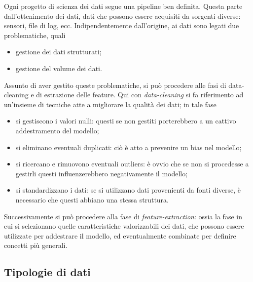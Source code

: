 \documentclass{subfiles}
\begin{document}
Ogni progetto di scienza dei dati segue una pipeline ben definita.
Questa parte dall'ottenimento dei dati, dati che possono essere acquisiti da sorgenti diverse: sensori, file di log, ecc.
Indipendentemente dall'origine, ai dati sono legati due problematiche, quali
\begin{itemize}
    \item gestione dei dati strutturati;
    \item gestione del volume dei dati.
\end{itemize}
Assunto di aver gestito queste problematiche, si può procedere alle fasi di data-cleaning e di estrazione delle feature.
Qui con \emph{data-cleaning} si fa riferimento ad un'insieme di tecniche atte a migliorare la qualità dei dati; in tale fase
\begin{itemize}
    \item si gestiscono i valori nulli: questi se non gestiti porterebbero a un cattivo addestramento del modello;
    \item si eliminano eventuali duplicati: ciò è atto a prevenire un bias nel modello;
    \item si ricercano e rimuovono eventuali outliers: è ovvio che se non si procedesse a gestirli questi influenzerebbero negativamente il modello;
    \item si standardizzano i dati: se si utilizzano dati provenienti da fonti diverse, è necessario che questi abbiano una stessa struttura.
\end{itemize}
Successivamente si può procedere alla fase di \emph{feature-extraction}: ossia la fase in cui si selezionano quelle caratteristiche valorizzabili dei dati,
che possono essere utilizzate per addestrare il modello, ed eventualmente combinate per definire concetti più generali.

\subsection{Tipologie di dati}


\end{document}

